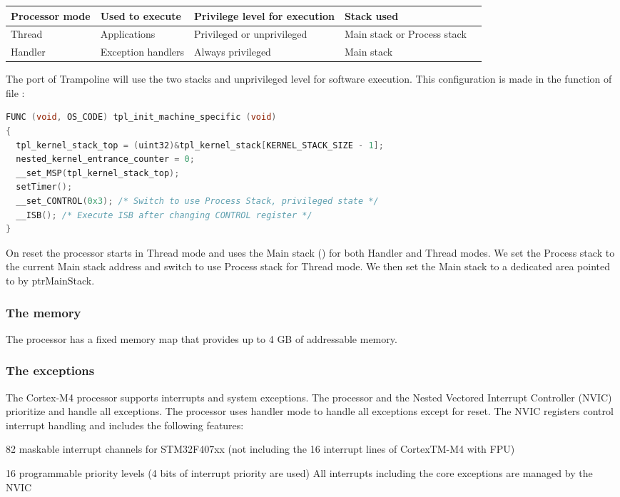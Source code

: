 \begin{longtable}[c]{llllp{3cm}}
\toprule
{\bf Processor mode} & {\bf Used to execute} & {\bf Privilege level for execution} & {\bf Stack used} \\
\midrule
Thread & Applications & Privileged or unprivileged & Main stack or Process stack \\
Handler & Exception handlers & Always privileged & Main stack \\
\bottomrule
\end{longtable}

The port of Trampoline will use the two stacks and unprivileged level for software execution. This configuration is made in the function  of file :

\begin{lstlisting}[language=C]
FUNC (void, OS_CODE) tpl_init_machine_specific (void)
{
  tpl_kernel_stack_top = (uint32)&tpl_kernel_stack[KERNEL_STACK_SIZE - 1];
  nested_kernel_entrance_counter = 0;
  __set_MSP(tpl_kernel_stack_top); 
  setTimer();
  __set_CONTROL(0x3); /* Switch to use Process Stack, privileged state */
  __ISB(); /* Execute ISB after changing CONTROL register */
}
\end{lstlisting}

On reset the processor starts in Thread mode and uses the Main stack () for both Handler and Thread modes.
We set the Process stack to the current Main stack address and switch to use Process stack for Thread mode.
We then set the Main stack to a dedicated area pointed to by ptrMainStack.

\subsubsection{The memory}

The processor has a fixed memory map that provides up to 4 GB of addressable memory.

\subsubsection{The exceptions}

The Cortex-M4 processor supports interrupts and system exceptions. The processor and the Nested Vectored Interrupt Controller (NVIC) prioritize and handle all exceptions. The processor uses handler mode to handle all exceptions except for reset.
The NVIC registers control interrupt handling and includes the following features:
\begin{penum}
\item 82 maskable interrupt channels for STM32F407xx (not including the 16 interrupt lines of CortexTM-M4 with FPU)
\item 16 programmable priority levels (4 bits of interrupt priority are used)
All interrupts including the core exceptions are managed by the NVIC
\end{penum}

